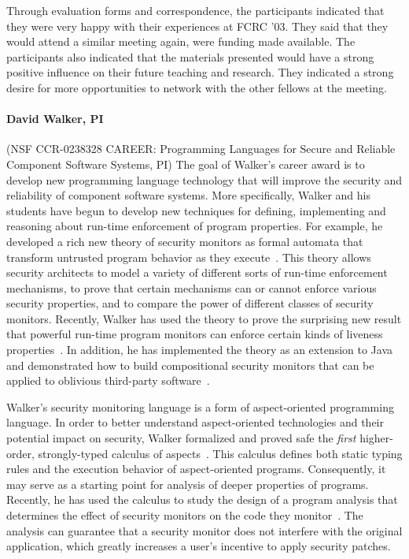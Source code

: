 \documentclass[11pt]{article}
\begin{document}
Through evaluation forms and correspondence, the participants
indicated that they were very happy with their experiences at
FCRC '03. They said that they would attend a similar meeting again,
were funding made available. The participants also indicated that the
materials presented would have a strong positive influence on their
future teaching and research.  They indicated a strong desire for more
opportunities to network with the other fellows at the meeting.

%

\paragraph*{David Walker, PI} (NSF CCR-0238328 CAREER: Programming Languages for Secure and Reliable Component Software
Systems, PI)
The goal of Walker's career award is to develop new programming language
technology that will improve the security and reliability of component software systems.
More specifically, Walker and his students have begun to develop new techniques for defining,
implementing and reasoning about run-time enforcement of program properties.
For example, he developed a rich new theory of security monitors as formal
automata that transform untrusted program behavior as they 
execute~\cite{ligatti+:edit-automata}.
This theory allows security
architects to model a variety of different sorts of run-time
enforcement mechanisms, to prove that certain mechanisms can or cannot
enforce various security properties, and to compare the power of
different classes of security monitors.    Recently, Walker 
has used the theory to prove the surprising new result that powerful run-time
program monitors can enforce certain kinds of liveness properties~\cite{ligatti+:renewal}.  
In addition, he has implemented the theory as an extension to Java and demonstrated
how to build compositional security monitors that can be applied to oblivious third-party 
software~\cite{bauer+:polymer}.

Walker's security monitoring language is a form of aspect-oriented programming language.
In order to better understand aspect-oriented technologies and their
potential impact on security, Walker formalized and proved
safe the {\em first} higher-order, strongly-typed calculus of 
aspects~\cite{walker+:aspects}.  This calculus defines
both static typing rules and the execution behavior of aspect-oriented
programs.  Consequently, it may
serve as a starting point for analysis of deeper properties of programs.
Recently, he has used the calculus to study the design of a
program analysis that determines the effect of security monitors on
the code they monitor~\cite{dantas+:harmless-advice}.   The analysis
can guarantee that a security monitor does not interfere with the 
original application, which greatly increases a user's incentive
to apply security patches.
\end{document}
